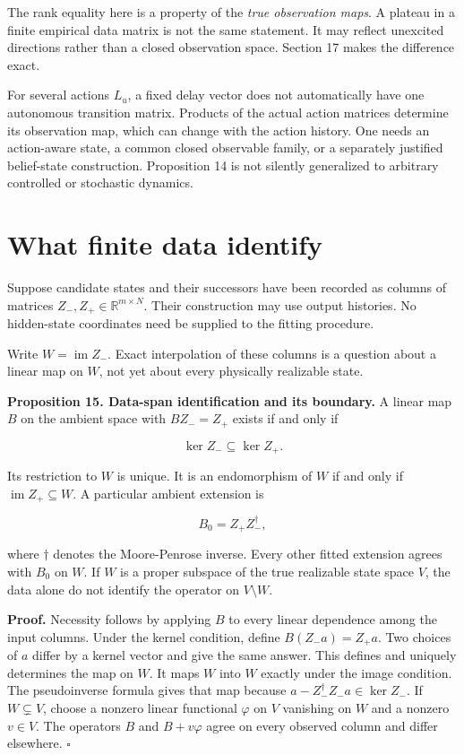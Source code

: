 The rank equality here is a property of the \emph{true observation
maps}. A plateau in a finite empirical data matrix is not the same
statement. It may reflect unexcited directions rather than a closed
observation space. Section 17 makes the difference exact.

For several actions \(L_u\), a fixed delay vector does not automatically
have one autonomous transition matrix. Products of the actual action
matrices determine its observation map, which can change with the action
history. One needs an action-aware state, a common closed observable
family, or a separately justified belief-state construction. Proposition
14 is not silently generalized to arbitrary controlled or stochastic
dynamics.

\section{What finite data identify}\label{LSM:what-finite-data-identify}

Suppose candidate states and their successors have been recorded as
columns of matrices \(Z_-,Z_+\in\mathbb R^{m\times N}\). Their
construction may use output histories. No hidden-state coordinates need
be supplied to the fitting procedure.

Write \(W=\operatorname{im}Z_-\). Exact interpolation of these columns
is a question about a linear map on \(W\), not yet about every
physically realizable state.

\textbf{Proposition 15. Data-span identification and its boundary.} A
linear map \(B\) on the ambient space with \(BZ_-=Z_+\) exists if and
only if

\[
\ker Z_-\subseteq\ker Z_+.
\]

Its restriction to \(W\) is unique. It is an endomorphism of \(W\) if
and only if \(\operatorname{im}Z_+\subseteq W\). A particular ambient
extension is

\[
B_0=Z_+Z_-^\dagger,
\]

where \(\dagger\) denotes the Moore-Penrose inverse. Every other fitted
extension agrees with \(B_0\) on \(W\). If \(W\) is a proper subspace of
the true realizable state space \(V\), the data alone do not identify
the operator on \(V\setminus W\).

\textbf{Proof.} Necessity follows by applying \(B\) to every linear
dependence among the input columns. Under the kernel condition, define
\(B(Z_-a)=Z_+a\). Two choices of \(a\) differ by a kernel vector and
give the same answer. This defines and uniquely determines the map on
\(W\). It maps \(W\) into \(W\) exactly under the image condition. The
pseudoinverse formula gives that map because
\(a-Z_-^\dagger Z_-a\in\ker Z_-\). If \(W\subsetneq V\), choose a
nonzero linear functional \(\varphi\) on \(V\) vanishing on \(W\) and a
nonzero \(v\in V\). The operators \(B\) and \(B+v\varphi\) agree on
every observed column and differ elsewhere. \(\square\)

